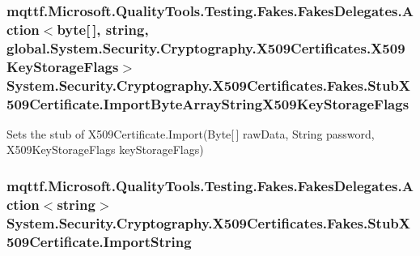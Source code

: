\hypertarget{class_system_1_1_security_1_1_cryptography_1_1_x509_certificates_1_1_fakes_1_1_stub_x509_certificate_a98ec1a6e28720740abac545456dc5910}{
\subsubsection[{Import\-Byte\-Array\-String\-X509\-Key\-Storage\-Flags}]{\setlength{\rightskip}{0pt plus 5cm}mqttf.\-Microsoft.\-Quality\-Tools.\-Testing.\-Fakes.\-Fakes\-Delegates.\-Action$<$byte\mbox{[}$\,$\mbox{]}, string, global.\-System.\-Security.\-Cryptography.\-X509\-Certificates.\-X509\-Key\-Storage\-Flags$>$ System.\-Security.\-Cryptography.\-X509\-Certificates.\-Fakes.\-Stub\-X509\-Certificate.\-Import\-Byte\-Array\-String\-X509\-Key\-Storage\-Flags}}\label{class_system_1_1_security_1_1_cryptography_1_1_x509_certificates_1_1_fakes_1_1_stub_x509_certificate_a98ec1a6e28720740abac545456dc5910}


Sets the stub of X509\-Certificate.\-Import(\-Byte\mbox{[}$\,$\mbox{]} raw\-Data, String password, X509\-Key\-Storage\-Flags key\-Storage\-Flags)

\hypertarget{class_system_1_1_security_1_1_cryptography_1_1_x509_certificates_1_1_fakes_1_1_stub_x509_certificate_afc330570343b4b8f0bace8ff962d4156}{
\subsubsection[{Import\-String}]{\setlength{\rightskip}{0pt plus 5cm}mqttf.\-Microsoft.\-Quality\-Tools.\-Testing.\-Fakes.\-Fakes\-Delegates.\-Action$<$string$>$ System.\-Security.\-Cryptography.\-X509\-Certificates.\-Fakes.\-Stub\-X509\-Certificate.\-Import\-String}}\label{class_system_1_1_security_1_1_cryptography_1_1_x509_certificates_1_1_fakes_1_1_stub_x509_certificate_afc330570343b4b8f0bace8ff962d4156}


